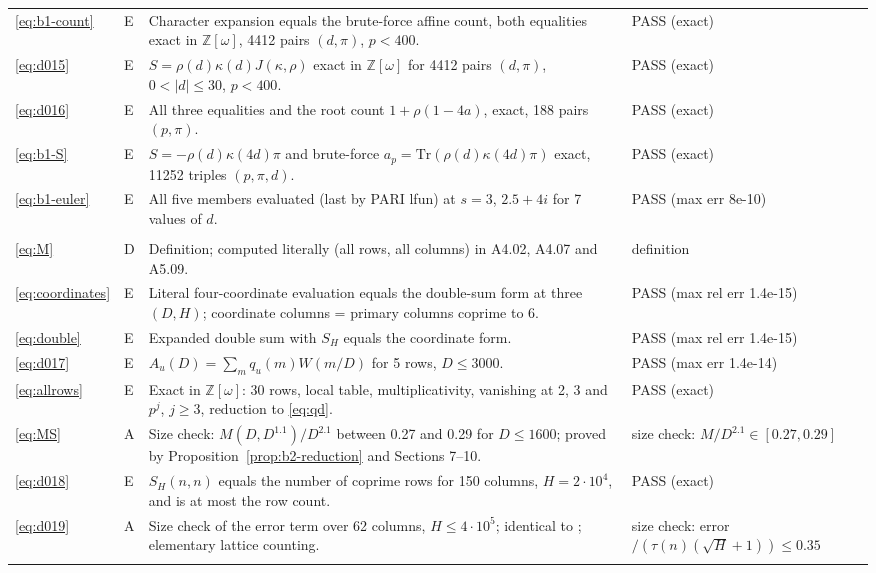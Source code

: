\documentclass[11pt]{article}
\numberwithin{equation}{section}
\begin{document}
\begin{longtable}{@{}>{\raggedright\arraybackslash}p{1.2cm}>{\centering\arraybackslash}p{0.7cm}>{\raggedright\arraybackslash}p{9.05cm}>{\raggedright\arraybackslash}p{4.3cm}@{}}
\eqref{eq:b1-count} & E & Character expansion equals the brute-force affine count, both equalities exact in $\mathbb Z[\omega]$, 4412 pairs $(d,\pi)$, $p<400$. & PASS (exact)\\
\eqref{eq:d015} & E & $S=\rho(d)\kappa(d)J(\kappa,\rho)$ exact in $\mathbb Z[\omega]$ for 4412 pairs $(d,\pi)$, $0<|d|\le30$, $p<400$. & PASS (exact)\\
\eqref{eq:d016} & E & All three equalities and the root count $1+\rho(1-4a)$, exact, 188 pairs $(p,\pi)$. & PASS (exact)\\
\eqref{eq:b1-S} & E & $S=-\rho(d)\kappa(4d)\pi$ and brute-force $a_p=\mathrm{Tr}(\rho(d)\kappa(4d)\pi)$ exact, 11252 triples $(p,\pi,d)$. & PASS (exact)\\
\eqref{eq:b1-euler} & E & All five members evaluated (last by PARI lfun) at $s=3$, $2.5+4i$ for 7 values of $d$. & PASS (max err 8e-10)\\
\multicolumn{4}{@{}l}{\emph{Section~4}}\\
\eqref{eq:M} & D & Definition; computed literally (all rows, all columns) in A4.02, A4.07 and A5.09. & definition\\
\eqref{eq:coordinates} & E & Literal four-coordinate evaluation equals the double-sum form at three $(D,H)$; coordinate columns = primary columns coprime to 6. & PASS (max rel err 1.4e-15)\\
\eqref{eq:double} & E & Expanded double sum with $S_H$ equals the coordinate form. & PASS (max rel err 1.4e-15)\\
\eqref{eq:d017} & E & $A_u(D)=\sum_mq_u(m)W(m/D)$ for 5 rows, $D\le3000$. & PASS (max err 1.4e-14)\\
\eqref{eq:allrows} & E & Exact in $\mathbb Z[\omega]$: 30 rows, local table, multiplicativity, vanishing at 2, 3 and $p^j$, $j\ge3$, reduction to \eqref{eq:qd}. & PASS (exact)\\
\eqref{eq:MS} & A & Size check: $M(D,D^{1.1})/D^{2.1}$ between 0.27 and 0.29 for $D\le1600$; proved by Proposition~\ref{prop:b2-reduction} and Sections 7--10. & size check: $M/D^{2.1}\in[0.27,0.29]$\\
\eqref{eq:d018} & E & $S_H(n,n)$ equals the number of coprime rows for 150 columns, $H=2\cdot10^4$, and is at most the row count. & PASS (exact)\\
\eqref{eq:d019} & A & Size check of the error term over 62 columns, $H\le4\cdot10^5$; identical to \cite[(4.2)]{ZG}; elementary lattice counting. & size check: error$/(\tau(n)(\sqrt H+1))\le0.35$\\
\multicolumn{4}{@{}l}{\emph{Section~5}}\\

\end{longtable}
\end{document}

